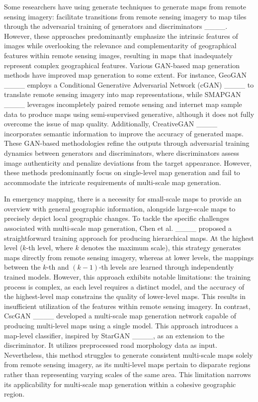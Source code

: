 Some researchers have using generate techniques to generate maps from remote sensing imagery: facilitate transitions from remote sensing imagery to map tiles through the adversarial training of generators and discriminators ____. However, these approaches predominantly emphasize the intrinsic features of images while overlooking the relevance and complementarity of geographical features within remote sensing images, resulting in maps that inadequately represent complex geographical features. Various GAN-based map generation methods have improved map generation to some extent. For instance, GeoGAN ____ employs a Conditional Generative Adversarial Network (cGAN) ____ to translate remote sensing imagery into map representations, while SMAPGAN ____ leverages incompletely paired remote sensing and internet map sample data to produce maps using semi-supervised generative, although it does not fully overcome the issue of map quality. Additionally, CreativeGAN ____ incorporates semantic information to improve the accuracy of generated maps. These GAN-based methodologies refine the outputs through adversarial training dynamics between generators and discriminators, where discriminators assess image authenticity and penalize deviations from the target appearance. However, these methods predominantly focus on single-level map generation and fail to accommodate the intricate requirements of multi-scale map generation.

In emergency mapping, there is a necessity for small-scale maps to provide an overview with general geographic information, alongside large-scale maps to precisely depict local geographic changes. To tackle the specific challenges associated with multi-scale map generation, Chen et al. ____ proposed a straightforward training approach for producing hierarchical maps. At the highest level (\(k\)-th level, where \(k\) denotes the maximum scale), this strategy generates maps directly from remote sensing imagery, whereas at lower levels, the mappings between the \(k\)-th and \((k-1)\)-th levels are learned through independently trained models. However, this approach exhibits notable limitations: the training process is complex, as each level requires a distinct model, and the accuracy of the highest-level map constrains the quality of lower-level maps. This results in insufficient utilization of the features within remote sensing imagery. In contrast, CscGAN ____ developed a multi-scale map generation network capable of producing multi-level maps using a single model. This approach introduces a map-level classifier, inspired by StarGAN ____, as an extension to the discriminator. It utilizes preprocessed road morphology data as input. Nevertheless, this method struggles to generate consistent multi-scale maps solely from remote sensing imagery, as its multi-level maps pertain to disparate regions rather than representing varying scales of the same area. This limitation narrows its applicability for multi-scale map generation within a cohesive geographic region.

